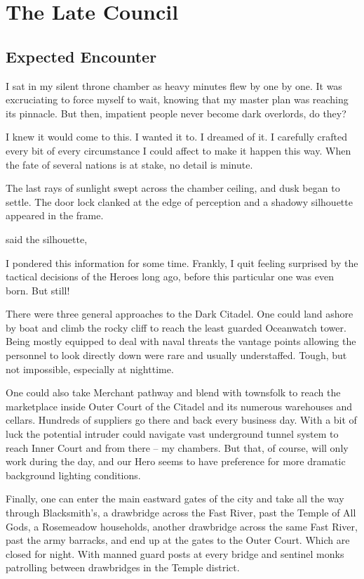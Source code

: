 \chapter{The Late Council}

\section{Expected Encounter}

I sat in my silent throne chamber as heavy minutes flew by one by one. It was excruciating to force myself to wait, knowing that my master plan was reaching its pinnacle. But then, impatient people never become dark overlords, do they?

I knew it would come to this. I wanted it to. I dreamed of it. I carefully crafted every bit of every circumstance I could affect to make it happen this way. When the fate of several nations is at stake, no detail is minute.

The last rays of sunlight swept across the chamber ceiling, and dusk began to settle. The door lock clanked at the edge of perception and a shadowy silhouette appeared in the frame.

 said the silhouette, 

I pondered this information for some time. Frankly, I quit feeling surprised by the tactical decisions of the Heroes long ago, before this particular one was even born. But still!

There were three general approaches to the Dark Citadel. One could land ashore by boat and climb the rocky cliff to reach the least guarded Oceanwatch tower. Being mostly equipped to deal with naval threats the vantage points allowing the personnel to look directly down were rare and usually understaffed. Tough, but not impossible, especially at nighttime.

One could also take Merchant pathway and blend with townsfolk to reach the marketplace inside Outer Court of the Citadel and its numerous warehouses and cellars. Hundreds of suppliers go there and back every business day. With a bit of luck the potential intruder could navigate vast underground tunnel system to reach Inner Court and from there -- my chambers. But that, of course, will only work during the day, and our Hero seems to have preference for more dramatic background lighting conditions.

Finally, one can enter the main eastward gates of the city and take all the way through Blacksmith’s, a drawbridge across the Fast River, past the Temple of All Gods, a Rosemeadow households, another drawbridge across the same Fast River, past the army barracks, and end up at the gates to the Outer Court. Which are closed for night. With manned guard posts at every bridge and sentinel monks patrolling between drawbridges in the Temple district.

